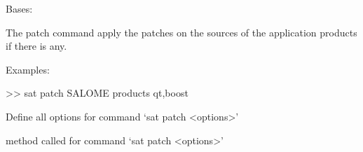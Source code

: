 \documentclass[a4paper,10pt,english]{sphinxmanual}
\begin{document}
\begin{fulllineitems}
\label{\detokenize{apidoc_commands/commands:commands.patch.Command}}
Bases: 

The patch command apply the patches on the sources of the application products
if there is any.

\begin{DUlineblock}{0em}
\item[] Examples:
\item[] \textgreater{}\textgreater{} sat patch SALOME \textendash{}products qt,boost
\end{DUlineblock}

\begin{fulllineitems}
\label{\detokenize{apidoc_commands/commands:commands.patch.Command.getParser}}
Define all options for command ‘sat patch \textless{}options\textgreater{}’

\end{fulllineitems}


\begin{fulllineitems}
\label{\detokenize{apidoc_commands/commands:commands.patch.Command.name}}
\end{fulllineitems}


\begin{fulllineitems}
\label{\detokenize{apidoc_commands/commands:commands.patch.Command.run}}
method called for command ‘sat patch \textless{}options\textgreater{}’

\end{fulllineitems}


\end{fulllineitems}

\end{document}
